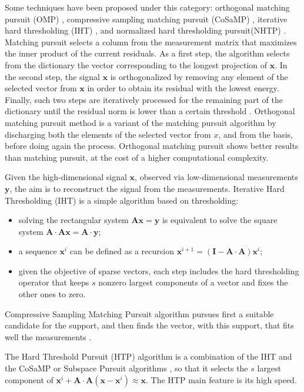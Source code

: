 Some techniques have been proposed under this category: orthogonal matching pursuit (OMP) \cite{Sensing14}, compressive sampling matching pursuit (CoSaMP) \cite{CoSaMP09}, iterative hard thresholding (IHT) \cite{IHT09}, and normalized hard thresholding pursuit(NHTP) \cite{Greedy08}. 
Matching pursuit selects a column from the measurement matrix that maximizes the inner product of the current residuals. As a first step, the algorithm selects from the dictionary the vector corresponding to the longest projection of $\mathbf{x}$. In the second step, the signal $\mathbf{x}$ is orthogonalized by removing any element of the selected vector from $\mathbf{x}$ in order to obtain its residual with the lowest energy. 
Finally, such two steps are iteratively processed
for the remaining part of the dictionary until the residual norm is lower than a certain threshold \cite{Phy16}.
Orthogonal matching pursuit method is a variant of the
matching pursuit algorithm by discharging both the elements of the selected vector from $x$, and from the
basis, before doing again the process. 
Orthogonal matching pursuit shows better results than
matching pursuit, at the cost of a higher computational complexity.

Given the high-dimensional signal $\mathbf{x}$, observed via low-dimensional measurements $\mathbf{y}$, the aim is to reconstruct the signal from the measurements.
Iterative Hard Thresholding (IHT) is a simple algorithm based on thresholding\cite{HTP11}:
\begin{itemize}
	\item solving the rectangular system $\mathbf{A}\mathbf{x} = \mathbf{y}$ is equivalent to solve the square system $\mathbf{A}\cdot \mathbf{A}\mathbf{x} =\mathbf{A}\cdot \mathbf{y}$;
	\item a sequence $\mathbf{x}^i$ can be defined as a recursion $\mathbf{x}^{i+1}=(\mathbf{I}-\mathbf{A}\cdot \mathbf{A})\mathbf{x}^i$;
	\item given the objective of sparse vectors, each step includes the hard thresholding operator that keeps $s$ nonzero largest components of a vector and fixes the other ones to zero.
\end{itemize} 

Compressive Sampling Matching Pursuit algorithm pursues first a suitable candidate for the support, and then finds the vector, with this support, that fits well the measurements \cite{HTP11}. 

The Hard Threshold Pursuit (HTP) algorithm is a combination of the IHT and the CoSaMP or Subspace Pursuit algorithms \cite{HTP11}, so that it selects the $s$ largest component of $\mathbf{x}^{i}+\mathbf{A}\cdot\mathbf{A}(\mathbf{x}-\mathbf{x}^i)\approx\mathbf{x}$.
The HTP main feature is its high speed.

